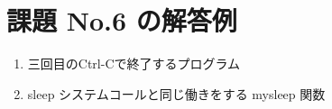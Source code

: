 \documentclass[a4j,twcolumn,11pt,nomag]{ltjarticle}      %
\begin{document}
\onecolumn

\section*{課題 No.6 の解答例}
\begin{enumerate}
\item 三回目のCtrl-Cで終了するプログラム

\newpage

\item sleep システムコールと同じ働きをする mysleep 関数
\end{enumerate}
\end{document}

